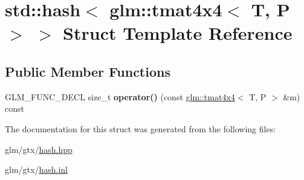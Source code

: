 \hypertarget{structstd_1_1hash_3_01glm_1_1tmat4x4_3_01T_00_01P_01_4_01_4}{\section{std\-:\-:hash$<$ glm\-:\-:tmat4x4$<$ T, P $>$ $>$ Struct Template Reference}
\label{structstd_1_1hash_3_01glm_1_1tmat4x4_3_01T_00_01P_01_4_01_4}
}
\subsection*{Public Member Functions}
\begin{DoxyCompactItemize}
\item 
\hypertarget{structstd_1_1hash_3_01glm_1_1tmat4x4_3_01T_00_01P_01_4_01_4_aa5f88911c5ef2b7ae947ae319a430c10}{G\-L\-M\-\_\-\-F\-U\-N\-C\-\_\-\-D\-E\-C\-L size\-\_\-t {\bfseries operator()} (const \hyperlink{structglm_1_1tmat4x4}{glm\-::tmat4x4}$<$ T, P $>$ \&m) const }\label{structstd_1_1hash_3_01glm_1_1tmat4x4_3_01T_00_01P_01_4_01_4_aa5f88911c5ef2b7ae947ae319a430c10}

\end{DoxyCompactItemize}


The documentation for this struct was generated from the following files\-:\begin{DoxyCompactItemize}
\item 
glm/gtx/\hyperlink{hash_8hpp}{hash.\-hpp}\item 
glm/gtx/\hyperlink{hash_8inl}{hash.\-inl}\end{DoxyCompactItemize}
